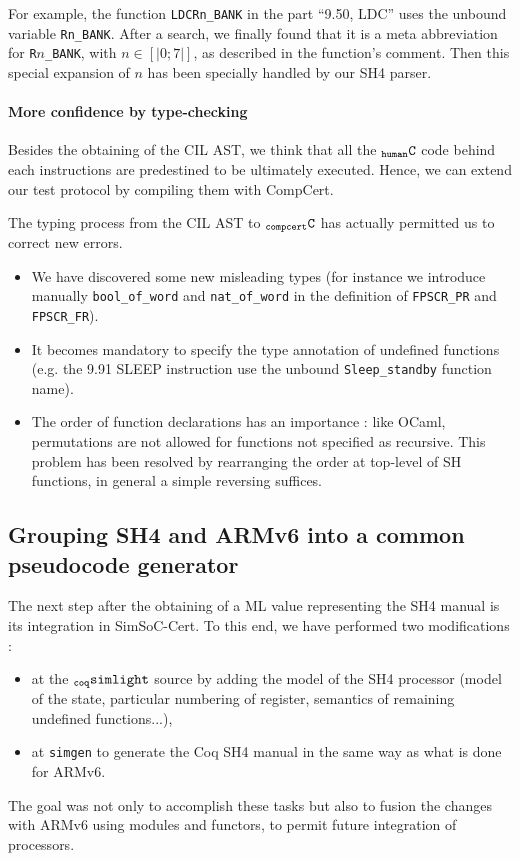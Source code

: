 \documentclass[a4paper, 11pt]{article}
\newcommand{\SL}{$_{\tt coq}{\tt simlight}$\xspace}
\newcommand{\simgen}{{\tt simgen}\xspace}
\newcommand{\C}{$_{\tt compcert}{\tt C}$\xspace}
\newcommand{\hC}{$_{\tt human}{\tt C}$\xspace}
\newcommand{\SScert}{SimSoC-Cert\xspace}
\begin{document}
For example, the function \verb|LDCRn_BANK| in the part ``9.50, LDC'' uses the unbound variable \verb|Rn_BANK|.  After a search, we finally found that it is a meta abbreviation for \verb|R|$n$\verb|_BANK|, with $n \in [|0;7|]$, as described in the function's comment. Then this special expansion of $n$ has been specially handled by our SH4 parser.

    \paragraph{More confidence by type-checking}
Besides the obtaining of the CIL AST, we think that all the \hC code behind each instructions are predestined to be ultimately executed. Hence, we can extend our test protocol by compiling them with CompCert.

The typing process from the CIL AST to \C has actually permitted us to correct new errors.
\begin{itemize}
\item We have discovered some new misleading types (for instance we introduce manually \verb|bool_of_word| and \verb|nat_of_word| in the definition of \verb|FPSCR_PR| and \verb|FPSCR_FR|).
\item It becomes mandatory to specify the type annotation of undefined functions (e.g. the 9.91 SLEEP instruction use the unbound \verb|Sleep_standby| function name). 
\item The order of function declarations has an importance : like OCaml, permutations are not allowed for functions not specified as recursive. This problem has been resolved by rearranging the order at top-level of SH functions, in general a simple reversing suffices.
\end{itemize}


  \subsection{Grouping SH4 and ARMv6 into a common pseudocode generator}
The next step after the obtaining of a ML value representing the SH4 manual is its integration in \SScert. To this end, we have performed two modifications : 
\begin{itemize}
\item at the \SL source by adding the model of the SH4 processor (model of the state, particular numbering of register, semantics of remaining undefined functions...),
\item at \simgen to generate the Coq SH4 manual in the same way as what is done for ARMv6.
\end{itemize}
The goal was not only to accomplish these tasks but also to fusion the changes with ARMv6 using modules and functors, to permit future integration of processors.
\end{document}

